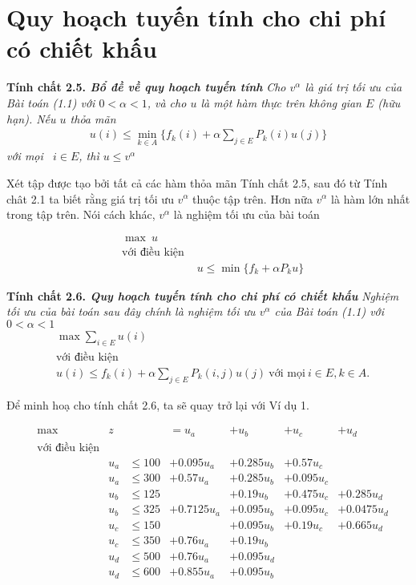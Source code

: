 \documentclass[12pt,a4paper]{report}
\begin{document}
 \section{Quy hoạch tuyến tính cho chi phí có chiết khấu}
   \begin{shaded*}
   	\noindent
   	\textbf{Tính chất 2.5. \textit{Bổ đề về quy hoạch tuyến tính}} \textit{ Cho $v^\alpha$ là giá trị tối ưu của Bài toán (1.1) với $0<\alpha<1$, và cho $u$ là một hàm thực trên không gian $E$ (hữu hạn). Nếu $u$ thỏa mãn
   		\begin{align*}
   		u(i) \leq \underset{k \in A}{\min}\{f_k(i)+\alpha \sum_{j \in E}P_k(i)u(j)\}
   		\end{align*}
   với mọi \ $i\in E$, thì $u \leq v^\alpha$	
    } 
   \end{shaded*}
  Xét tập được tạo bởi tất cả các hàm thỏa mãn Tính chất 2.5, sau đó từ Tính chât 2.1 ta biết rằng giá trị tối ưu $v^\alpha$ thuộc tập trên. Hơn nữa $v^\alpha$ là hàm lớn nhất trong tập trên. Nói cách khác, $v^\alpha$ là nghiệm tối ưu của bài toán
  
  \begin{align*}
  &\max \ u\\
  &\text{với điều kiện } \\
  & & u \leq \min\{f_k+\alpha P_k u\}
  \end{align*} 
  \begin{shaded*}
  	\noindent
  	\textbf{Tính chất 2.6. \textit{Quy hoạch tuyến tính cho chi phí có chiết khấu}} \textit{ Nghiệm tối ưu của bài toán sau đây chính là nghiệm tối ưu $v^\alpha$ của Bài toán (1.1) với $0<\alpha<1$
  		\begin{align*}
  		&\max \sum _{i\in E}u(i)\\
  		&\text{với điều kiện } \\
  		&u(i)\leq f_k(i)+\alpha \sum_{j \in E}P_k(i,j)u(j) \ \text{với mọi} \ i \in E, k \in A.  
  		\end{align*}
  	} 
  
  \end{shaded*}
  
  \medskip
  Để minh hoạ cho tính chất 2.6, ta sẽ quay trở lại với Ví dụ 1.
  
  \begin{align*}
  &\max & z&&=u_a&+u_b&+u_c&+u_d\\
  &\text{với điều kiện}\\
  && u_a &\leq 100&+0.095u_a&+0.285u_b&+0.57u_c\\
  && u_a &\leq 300&+0.57u_a&+0.285u_b&+0.095u_c&\\
  &&u_b&\leq 125&              &+0.19u_b&+0.475u_c&+0.285u_d\\
  &&u_b&\leq 325&+0.7125u_a&+0.095u_b&+0.095u_c&+0.0475u_d \\
  &&u_c &\leq 150&&+0.095u_b&+0.19u_c&+0.665u_d\\
  &&u_c&\leq 350&+0.76u_a&+0.19u_b \\
  &&u_d&\leq 500&+0.76u_a&+0.095u_d\\
  &&u_d&\leq 600&+0.855u_a&+0.095u_b
  \end{align*}
   
\end{document}
